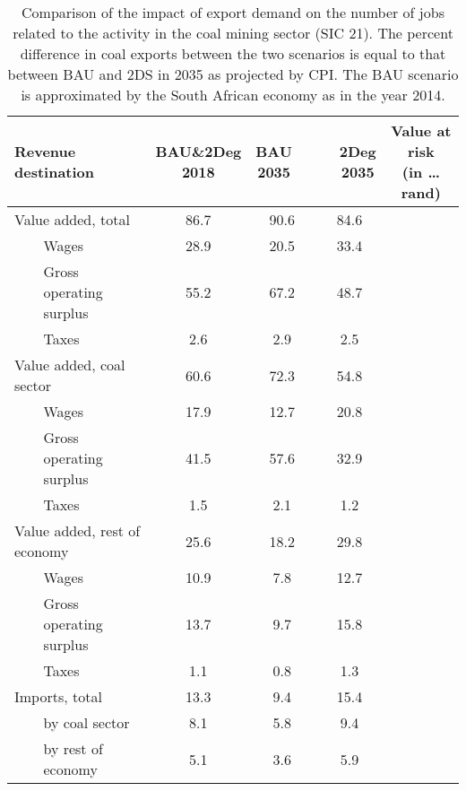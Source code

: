 \documentclass[12pt,english]{article}
\begin{document}
\begin{table}[ht]
	\centering
	\renewcommand*{\arraystretch}{1.15}
	\begin{tabular}{lp{20pt}lcccc}
		\toprule
		\multicolumn{3}{l}{Revenue destination } & \makecell{BAU\&2Deg \\2018} & \makecell{BAU\ \  \\ 2035\ \ } & \makecell{\ \ 2Deg \\\ \ 2035} & \makecell{Value at risk \\(in \ldots rand)}\\ 
		\midrule
		\multicolumn{3}{l}{Value added, total}   & 86.7  & 90.6 & 84.6 & \\ 	
		& 						 & Wages & 28.9 & 20.5  & 33.4 \\ 
		& 						 & Gross operating surplus & 55.2  &  67.2  & 48.7 &\\ 
		& 						 & Taxes & 2.6 &  2.9 & 2.5 & \\
		\midrule
		\multicolumn{3}{l}{Value added, coal sector}  & 60.6 & 72.3 & 54.8 \\ 
		& 						 & Wages & 17.9 &  12.7 & 20.8 \\ 
		& 						 & Gross operating surplus & 41.5 & 57.6  & 32.9 & \\ 
		& 						 & Taxes & 1.5 &  2.1 & 1.2 \\
		\midrule
		\multicolumn{3}{l}{Value added, rest of economy}  & 25.6  & 18.2 & 29.8 \\ 
		& 						 & Wages & 10.9 & 7.8  & 12.7 \\ 
		& 						 & Gross operating surplus & 13.7 &  9.7  & 15.8 & \\ 
		& 						 & Taxes & 1.1 & 0.8  & 1.3 \\
		\midrule
		\multicolumn{3}{l}{Imports, total}  		 & 13.3  & 9.4  & 15.4 & \\ 	
		& 						 & by coal sector & 8.1 &  5.8 & 9.4 & \\ 
		& 						 & by rest of economy & 5.1 &  3.6  & 5.9 & \\ 
		\bottomrule
	\end{tabular}
	\caption{\label{ExportRevenue_Decomposition_Diff_table}\small Comparison of the impact of export demand on the number of jobs related to the activity in the coal mining sector (SIC 21). The percent difference in coal exports between the two scenarios is equal to that between BAU and 2DS in 2035 as projected by CPI. The BAU scenario is approximated by the South African economy as in the year 2014.}
\end{table}
\end{document}

